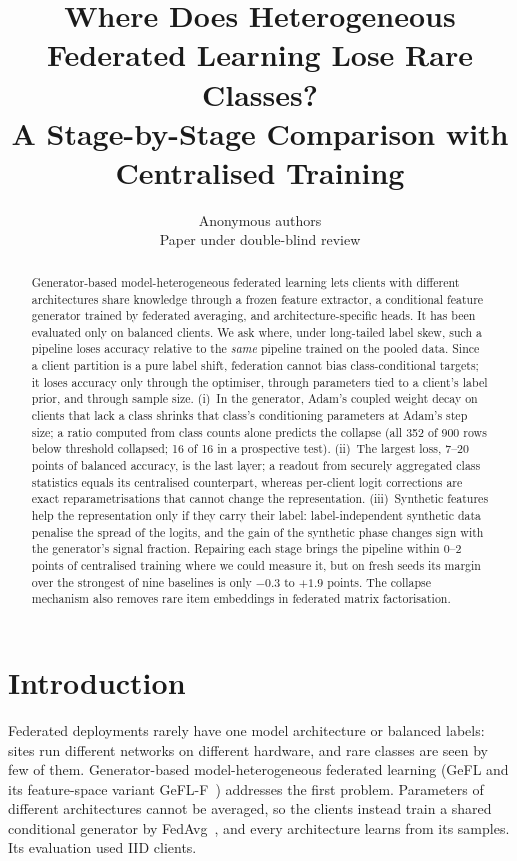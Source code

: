 \documentclass[10pt]{article}
\title{Where Does Heterogeneous Federated Learning Lose Rare Classes?\\
A Stage-by-Stage Comparison with Centralised Training}
\author{Anonymous authors\\Paper under double-blind review}
\date{}
\theoremstyle{plain}
\theoremstyle{definition}
\begin{document}
\maketitle

\begin{abstract}
Generator-based model-heterogeneous federated learning lets clients with different architectures share knowledge
through a frozen feature extractor, a conditional feature generator trained by federated averaging, and
architecture-specific heads. It has been evaluated only on balanced clients. We ask where, under long-tailed label
skew, such a pipeline loses accuracy relative to the \emph{same} pipeline trained on the pooled data. Since a client
partition is a pure label shift, federation cannot bias class-conditional targets; it loses accuracy only through the
optimiser, through parameters tied to a client's label prior, and through sample size. (i)~In the generator, Adam's
coupled weight decay on clients that lack a class shrinks that class's conditioning parameters at Adam's step size; a
ratio computed from class counts alone predicts the collapse (all 352 of 900 rows below threshold collapsed; 16 of 16
in a prospective test). (ii)~The largest loss, 7--20 points of balanced accuracy, is the last layer; a readout from
securely aggregated class statistics equals its centralised counterpart, whereas per-client logit corrections are
exact reparametrisations that cannot change the representation. (iii)~Synthetic features help the representation
only if they carry their label: label-independent synthetic data penalise the spread of the logits, and the gain of
the synthetic phase changes sign with the generator's signal fraction. Repairing each stage brings the pipeline within
0--2 points of centralised training where we could measure it, but on fresh seeds its margin over the strongest of
nine baselines is only $-0.3$ to $+1.9$ points. The collapse mechanism also removes rare item embeddings in federated
matrix factorisation.
\end{abstract}

\section{Introduction}

Federated deployments rarely have one model architecture or balanced labels: sites run different networks on
different hardware, and rare classes are seen by few of them. Generator-based model-heterogeneous federated learning
(GeFL and its feature-space variant GeFL-F~\cite{kang2025gefl}) addresses the first problem. Parameters of different
architectures cannot be averaged, so the clients instead train a shared conditional generator by FedAvg~\cite{mcmahan2017},
and every architecture learns from its samples. Its evaluation used IID clients.
\end{document}
